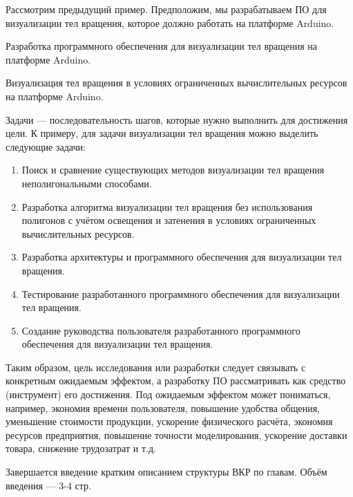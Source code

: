 \documentclass[14pt]{extarticle}
\begin{document}
Рассмотрим предыдущий пример. Предположим, мы разрабатываем ПО для визуализации тел вращения, которое должно работать на платформе Arduino.

\begin{tcolorbox}[colback=red!10, colframe=red!50!black, title={Пример неправильно сформулированной цели}]
	\par Разработка программного обеспечения для визуализации тел вращения на платформе Arduino.
\end{tcolorbox}
\begin{tcolorbox}[title={Пример правильно сформулированной цели}]
	\par Визуализация тел вращения в условиях ограниченных вычислительных ресурсов на платформе Arduino.
\end{tcolorbox}

Задачи --- последовательность шагов, которые нужно выполнить для достижения цели. К примеру, для задачи визуализации тел вращения можно выделить следующие задачи:
\begin{enumerate}[label=\arabic*., wide]
	\item Поиск и сравнение существующих методов визуализации тел вращения неполигональными способами.
	\item Разработка алгоритма визуализации тел вращения без использования полигонов с учётом освещения и затенения в условиях ограниченных вычислительных ресурсов.
	\item Разработка архитектуры и программного обеспечения для визуализации тел вращения.
	\item Тестирование разработанного программного обеспечения для визуализации тел вращения.	
	\item Создание руководства пользователя разработанного программного обеспечения для визуализации тел вращения.
\end{enumerate}

 Таким образом, цель исследования или разработки следует связывать с конкретным ожидаемым эффектом, а разработку ПО рассматривать как средство (инструмент) его достижения. Под ожидаемым эффектом может пониматься, например, экономия времени пользователя, повышение удобства общения, уменьшение стоимости продукции, ускорение физического расчёта, экономия ресурсов предприятия, повышение точности моделирования, ускорение доставки товара, снижение трудозатрат и т.д.

Завершается введение кратким описанием структуры ВКР по главам. Объём введения --- 3-4 стр.
\end{document}
